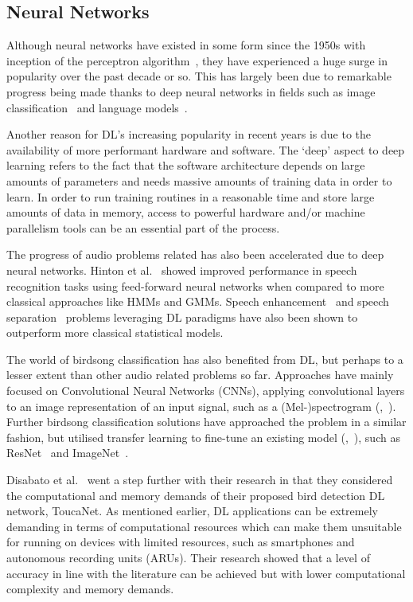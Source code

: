 \subsection{Neural Networks}

Although neural networks have existed in some form since the 1950s with
inception of the perceptron algorithm~\cite{rosenblatt1958perceptron}, they have
experienced a huge surge in popularity over the past decade or so. This has
largely been due to remarkable progress being made thanks to deep neural
networks in fields such as image classification~\cite{krizhevsky2012imagenet}
and language models~\cite{mikolov2010recurrent}.

Another reason for DL's increasing popularity in recent years is due
to the availability of more performant hardware and software. The `deep' aspect
to deep learning refers to the fact that the software architecture depends on
large amounts of parameters and needs massive amounts of training data in order
to learn. In order to run training routines in a reasonable time and store large
amounts of data in memory, access to powerful hardware and/or machine
parallelism tools can be an essential part of the process.

The progress of audio problems related has also been accelerated due to deep
neural networks. Hinton et al.~\cite{hinton2012deep} showed improved performance
in speech recognition tasks using feed-forward neural networks when compared to
more classical approaches like HMMs and GMMs. Speech
enhancement~\cite{afouras2018conversation} and speech
separation~\cite{ephrat2018looking} problems leveraging DL paradigms
have also been shown to outperform more classical statistical models. 

The world of birdsong classification has also benefited from DL, but
perhaps to a lesser extent than other audio related problems so far. Approaches
have mainly focused on Convolutional Neural Networks (CNNs), applying
convolutional layers to an image representation of an input signal, such as a
(Mel-)spectrogram (\cite{berger2018bird},~\cite{mukherjee2018convolutional}).
Further birdsong classification solutions have approached the problem in a
similar fashion, but utilised transfer learning to fine-tune an existing model
(\cite{disabato2021birdsong},~\cite{lasseck2018acoustic}), such as
ResNet~\cite{he2016deep} and ImageNet~\cite{deng2009imagenet}. 

Disabato et al.~\cite{disabato2021birdsong} went a step further with their
research in that they considered the computational and memory demands of their
proposed bird detection DL network, ToucaNet. As mentioned earlier, DL
applications can be extremely demanding in terms of computational resources
which can make them unsuitable for running on devices with limited resources,
such as smartphones and autonomous recording units (ARUs). Their research showed
that a level of accuracy in line with the literature can be achieved but with
lower computational complexity and memory demands.

